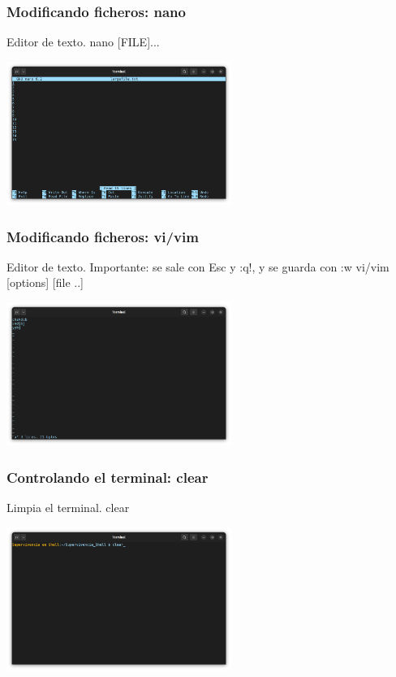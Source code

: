 \documentclass[10pt]{beamer}
\begin{document}
	\begin{frame}
		\frametitle{Modificando ficheros: nano}
		\begin{alertblock}{Editor de texto.}
			nano [FILE]...
		\end{alertblock}
		\begin{center}
			\includegraphics[width=0.55\textwidth]{nano}
		\end{center}
	\end{frame}
	
	\begin{frame}
		\frametitle{Modificando ficheros: vi/vim}
		\begin{alertblock}{Editor de texto. Importante: se sale con Esc y :q!, y se guarda con :w}
			vi/vim [options] [file ..]
		\end{alertblock}
		\begin{center}
			\includegraphics[width=0.55\textwidth]{vim}
		\end{center}
	\end{frame}
	
	\begin{frame}
		\frametitle{Controlando el terminal: clear}
		\begin{alertblock}{Limpia el terminal.}
			clear
		\end{alertblock}
		\begin{center}
			\includegraphics[width=0.55\textwidth]{clear}
		\end{center}

	\end{frame}	
	
\end{document}
